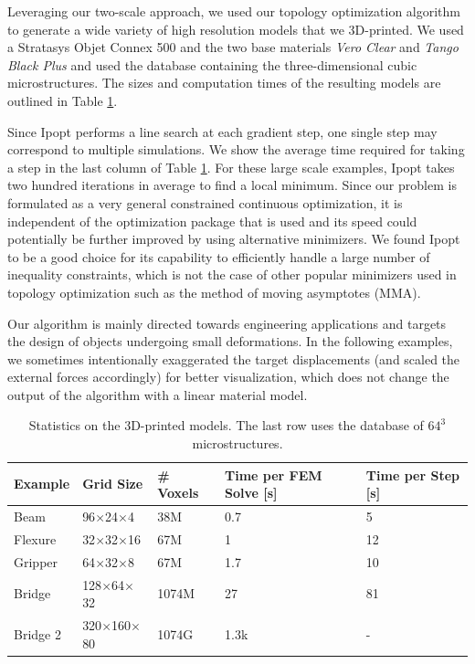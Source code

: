 	Leveraging our two-scale approach, we used our topology optimization algorithm to generate a wide variety of high resolution models that we 3D-printed. We used a Stratasys Objet Connex 500 and the two base materials \emph{Vero Clear} and \emph{Tango Black Plus} and used the database containing the three-dimensional cubic microstructures. The sizes and computation times of the resulting models are outlined in Table \ref{tab:results}. 
	
	Since Ipopt performs a line search at each gradient step, one single step may correspond to multiple simulations. We show the average time required for taking a step in the last column of Table \ref{tab:results}. For these large scale examples, Ipopt takes two hundred iterations in average to find a local minimum. 
	Since our problem is formulated as a very general constrained continuous optimization, it is independent of the optimization package that is used and its speed could potentially be further improved by using alternative minimizers. 
	We found Ipopt to be a good choice for its capability to efficiently handle a large number of inequality constraints, which is not the case of other popular minimizers used in topology optimization such as the method of moving asymptotes (MMA).
	
	Our algorithm is mainly directed towards engineering applications and targets the design of objects undergoing small deformations. In the following examples, we sometimes intentionally exaggerated the target displacements (and scaled the external forces accordingly) for better visualization, which does not change the output of the algorithm with a linear material model.
	
	\begin{table}
		\centering
		\footnotesize
		\caption{Statistics on the 3D-printed models. The last row uses the database of $64^3$ microstructures.} 
		{
			\begin{tabularx}{\linewidth}{ |X| X | X | p{3cm}| p{3cm}| }
				\hline
				Example & Grid Size & \# Voxels & Time per FEM Solve [s] & Time per Step [s]\\ \hline
				Beam   & 96$\times$24$\times$4  & 38M  &  0.7 & 5\\
				Flexure & 32$\times$32$\times$16 & 67M  & 1 & 12\\
				Gripper   & 64$\times$32$\times$8  & 67M  & 1.7 & 10\\	\hline
				Bridge & 128$\times$64$\times$32 & 1074M  & 27 & 81\\
				Bridge 2 & 320$\times$160$\times$80 & 1074G  & 1.3k & - \\
				\hline
			\end{tabularx} }
			\label{tab:results}
		\end{table}
		
